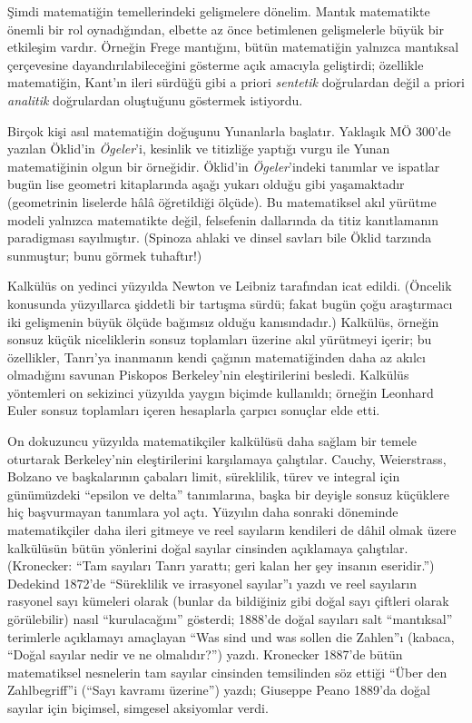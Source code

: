 \documentclass[../../../include/open-logic-section]{subfiles}
\begin{document}
Şimdi matematiğin temellerindeki gelişmelere dönelim. Mantık matematikte
önemli bir rol oynadığından, elbette az önce betimlenen gelişmelerle büyük
bir etkileşim vardır. Örneğin Frege mantığını, bütün matematiğin yalnızca
mantıksal çerçevesine dayandırılabileceğini gösterme açık amacıyla
geliştirdi; özellikle matematiğin, Kant'ın ileri sürdüğü gibi a priori
\emph{sentetik} doğrulardan değil a priori \emph{analitik} doğrulardan
oluştuğunu göstermek istiyordu.

Birçok kişi asıl matematiğin doğuşunu Yunanlarla başlatır. Yaklaşık MÖ
300'de yazılan Öklid'in \emph{Ögeler}'i, kesinlik ve titizliğe yaptığı
vurgu ile Yunan matematiğinin olgun bir örneğidir. Öklid'in \emph{Ögeler}'indeki
tanımlar ve ispatlar bugün lise geometri kitaplarında aşağı yukarı olduğu
gibi yaşamaktadır (geometrinin liselerde hâlâ öğretildiği ölçüde). Bu
matematiksel akıl yürütme modeli yalnızca matematikte değil, felsefenin
dallarında da titiz kanıtlamanın paradigması sayılmıştır. (Spinoza ahlaki ve
dinsel savları bile Öklid tarzında sunmuştur; bunu görmek tuhaftır!)

Kalkülüs on yedinci yüzyılda Newton ve Leibniz tarafından icat edildi.
(Öncelik konusunda yüzyıllarca şiddetli bir tartışma sürdü; fakat bugün çoğu
araştırmacı iki gelişmenin büyük ölçüde bağımsız olduğu kanısındadır.)
Kalkülüs, örneğin sonsuz küçük niceliklerin sonsuz toplamları üzerine akıl
yürütmeyi içerir; bu özellikler, Tanrı'ya inanmanın kendi çağının
matematiğinden daha az akılcı olmadığını savunan Piskopos Berkeley'nin
eleştirilerini besledi. Kalkülüs yöntemleri on sekizinci yüzyılda yaygın
biçimde kullanıldı; örneğin Leonhard Euler sonsuz toplamları içeren
hesaplarla çarpıcı sonuçlar elde etti.

On dokuzuncu yüzyılda matematikçiler kalkülüsü daha sağlam bir temele
oturtarak Berkeley'nin eleştirilerini karşılamaya çalıştılar. Cauchy,
Weierstrass, Bolzano ve başkalarının çabaları limit, süreklilik, türev ve
integral için günümüzdeki ``epsilon ve delta'' tanımlarına, başka bir
deyişle sonsuz küçüklere hiç başvurmayan tanımlara yol açtı. Yüzyılın daha
sonraki döneminde matematikçiler daha ileri gitmeye ve reel sayıların
kendileri de dâhil olmak üzere kalkülüsün bütün yönlerini doğal sayılar
cinsinden açıklamaya çalıştılar. (Kronecker: ``Tam sayıları Tanrı yarattı;
geri kalan her şey insanın eseridir.'') Dedekind 1872'de ``Süreklilik ve
irrasyonel sayılar''ı yazdı ve reel sayıların rasyonel sayı kümeleri olarak
(bunlar da bildiğiniz gibi doğal sayı çiftleri olarak görülebilir) nasıl
``kurulacağını'' gösterdi; 1888'de doğal sayıları salt ``mantıksal''
terimlerle açıklamayı amaçlayan ``Was sind und was sollen die Zahlen''ı
(kabaca, ``Doğal sayılar nedir ve ne olmalıdır?'') yazdı. Kronecker 1887'de
bütün matematiksel nesnelerin tam sayılar cinsinden temsilinden söz ettiği
``\"Uber den Zahlbegriff''i (``Sayı kavramı üzerine'') yazdı; Giuseppe Peano
1889'da doğal sayılar için biçimsel, simgesel aksiyomlar verdi.
\end{document}
